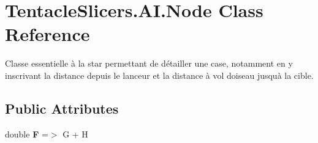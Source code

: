 \hypertarget{class_tentacle_slicers_1_1_a_i_1_1_node}{}\section{Tentacle\+Slicers.\+A\+I.\+Node Class Reference}
\label{class_tentacle_slicers_1_1_a_i_1_1_node}


Classe essentielle à l\textquotesingle{}a star permettant de détailler une case, notamment en y inscrivant la distance depuis le lanceur et la distance à vol d\textquotesingle{}oiseau jusqu\textquotesingle{}à la cible.  


\subsection*{Public Attributes}
\begin{DoxyCompactItemize}
\item 
\mbox{\label{class_tentacle_slicers_1_1_a_i_1_1_node_ac43fb5c92bf4ae18cfedd9ee62d770ce}} 
double {\bfseries F} =$>$ G + H
\end{DoxyCompactItemize}
